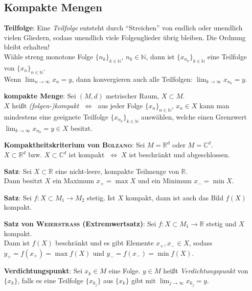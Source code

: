 \subsection{%
    Kompakte Mengen%
}

\textbf{Teilfolge}: Eine \emph{Teilfolge} entsteht durch "`Streichen"' von
endlich oder unendlich vielen Gliedern, sodass unendlich viele Folgenglieder
übrig bleiben.
Die Ordnung bleibt erhalten! \\
Wähle streng monotone Folge $\{n_k\}_{k \in \mathbb{N}}$,
$n_k \in \mathbb{N}$, dann ist $\{x_{n_k}\}_{k \in \mathbb{N}}$ eine Teilfolge
von $\{x_n\}_{n \in \mathbb{N}}$. \\
Wenn $\lim_{n \to \infty} x_n = y$, dann konvergieren auch alle Teilfolgen:
$\lim_{k \to \infty} x_{n_k} = y$.

\textbf{kompakte Menge}: Sei $(M,d)$ metrischer Raum, $X \subset M$. \\
$X$ heißt \emph{(folgen-)kompakt} $\;\Leftrightarrow\;$ aus jeder Folge
$\{x_n\}_{n \in \mathbb{N}}$, $x_n \in X$ kann man mindestens eine geeignete
Teilfolge $\{x_{n_k}\}_{k \in \mathbb{N}}$ auswählen, welche einen Grenzwert
$\lim_{k \to \infty} x_{n_k} = y \in X$ besitzt.

\textbf{Kompaktheitskriterium von \textsc{Bolzano}}: Sei $M = \mathbb{R}^d$
oder $M = \mathbb{C}^d$. \\
$X \subset \mathbb{R}^d$ bzw. $X \subset \mathbb{C}^d$ ist kompakt
$\;\Leftrightarrow\; X$ ist beschränkt und abgeschlossen.

\linie

\textbf{Satz}: Sei $X \subset \mathbb{R}$ eine nicht-leere, kompakte
Teilmenge von $\mathbb{R}$. \\
Dann besitzt $X$ ein Maximum $x_+ = \max X$ und ein Minimum $x_- = \min X$.

\textbf{Satz}: Sei $f: X \subset M_1 \rightarrow M_2$ stetig.
Ist $X$ kompakt, dann ist auch das Bild $f(X)$ kompakt.

\textbf{Satz von \textsc{Weierstraß} (Extremwertsatz)}:
Sei $f: X \subset M_1 \rightarrow \mathbb{R}$ stetig und $X$ kompakt. \\
Dann ist $f(X)$ beschränkt und es gibt Elemente $x_+, x_- \in X$, sodass
$y_+ = f(x_+) = \max f(X)$ und $y_- = f(x_-) = \min f(X)$.

\linie

\textbf{Verdichtungspunkt}: Sei $x_k \in M$ eine Folge.
$y \in M$ heißt \emph{Verdichtungspunkt} von $\{x_k\}$,
falls es eine Teilfolge $\{x_{k_j}\}$ aus $\{x_k\}$ gibt mit
$\lim_{j \to \infty} x_{k_j} = y$.

